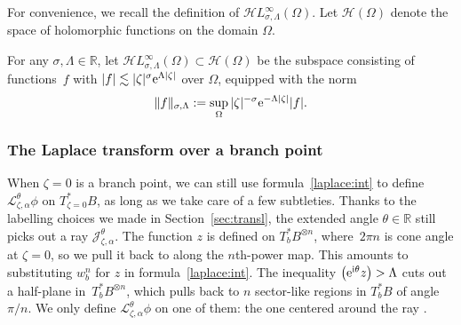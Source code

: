 \documentclass[pdftex]{sigma}
\let\Re\relax
\DeclareMathOperator{\Re}{Re}
\newcommand{\holo}{\mathcal{H}}
\newcommand{\singexp}[2]{\mathcal{H}L^\infty_{#1, #2}}
\newcommand{\R}{\mathbb{R}}
\newcommand{\laplace}{\mathcal{L}}
\numberwithin{equation}{section}
\begin{document}
For convenience, we recall the definition of $\singexp{\sigma}{\Lambda}(\Omega)$. Let $\holo(\Omega)$ denote the space of holomorphic functions on the domain $\Omega$.
\begin{Definition}\label{def:HL_inf}
For any $\sigma, \Lambda \in \R$, let
$\singexp{\sigma}{\Lambda}(\Omega) \subset \holo(\Omega) $
be the subspace consisting of functions~$f$ with $|f| \lesssim |\zeta|^\sigma {\rm e}^{\Lambda|\zeta|}$ over $\Omega$, equipped with the norm
\[ \|f\|_{\sigma,\Lambda} := \sup_\Omega |\zeta|^{-\sigma} {\rm e}^{-\Lambda|\zeta|} |f|. \]
\end{Definition}
\subsubsection{The Laplace transform over a branch point}
When $\zeta = 0$ is a branch point, we can still use formula~\eqref{laplace:int} to define $\laplace_{\zeta, \alpha}^\theta \phi$ on $T_{\zeta = 0}^*B$, as long as we take care of a few subtleties. Thanks to the labelling choices we made in Section~\ref{sec:transl}, the extended angle $\theta \in \R$ still picks out a ray $\mathcal{J}_{\zeta, \alpha}^\theta$. The function $z$ is defined on $T_b^*B^{\otimes n}$, where~$2\pi n$ is cone angle at $\zeta = 0$, so we pull it back to  along the $n$th-power map. This amounts to substituting $w_b^n$ for $z$ in formula~\eqref{laplace:int}. The inequality $\Re\bigl({\rm e}^{{\rm i}\theta} z\bigr) > \Lambda$ cuts out a half-plane in~$T_b^*B^{\otimes n}$, which pulls back to $n$ sector-like regions in $T_b^*B$ of angle $\pi/n$. We only define $\laplace_{\zeta, \alpha}^\theta \phi$ on one of them: the one centered around the ray \smash{$w_b \in {\rm e}^{-{\rm i}\theta/n}[0, \infty)$}.
\end{document}
